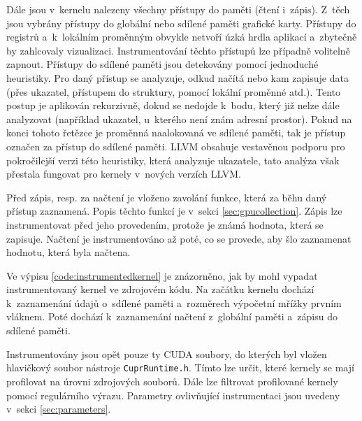 Dále jsou v~kernelu nalezeny všechny přístupy do paměti (čtení i~zápis). Z~těch jsou vybrány přístupy do globální nebo sdílené paměti grafické karty. Přístupy do registrů a~k~lokálním proměnným obvykle netvoří úzká hrdla aplikací a~zbytečně by zahlcovaly vizualizaci. Instrumentování těchto přístupů lze případně volitelně zapnout. Přístupy do sdílené paměti jsou detekovány pomocí jednoduché heuristiky. Pro daný přístup se analyzuje, odkud načítá nebo kam zapisuje data (přes ukazatel, přístupem do struktury, pomocí lokální proměnné atd.). Tento postup je aplikován rekurzivně, dokud se nedojde k~bodu, který již nelze dále analyzovat (například ukazatel, u~kterého není znám adresní prostor). Pokud na konci tohoto řetězce je proměnná naalokovaná ve sdílené paměti, tak je přístup označen za přístup do sdílené paměti. LLVM obsahuje vestavěnou podporu pro pokročilejší verzi této heuristiky, která analyzuje ukazatele, tato analýza však přestala fungovat pro kernely v~nových verzích LLVM.

Před zápis, resp. za načtení je vloženo zavolání funkce, která za běhu daný přístup zaznamená. Popis těchto funkcí je v~sekci \ref{sec:gpucollection}. Zápis lze instrumentovat před jeho provedením, protože je známá hodnota, která se zapisuje. Načtení je instrumentováno až poté, co se provede, aby šlo zaznamenat hodnotu, která byla načtena.

Ve výpisu \ref{code:instrumentedkernel} je znázorněno, jak by mohl vypadat instrumentovaný kernel ve zdrojovém kódu. Na začátku kernelu dochází k~zaznamenání údajů o~sdílené paměti a~rozměrech výpočetní mřížky prvním vláknem. Poté dochází k~zaznamenání načtení z~globální paměti a~zápisu do sdílené paměti.
    
Instrumentovány jsou opět pouze ty CUDA soubory, do kterých byl vložen hlavičkový soubor nástroje \texttt{CuprRuntime.h}. Tímto lze určit, které kernely se mají profilovat na úrovni zdrojových souborů. Dále lze filtrovat profilované kernely pomocí regulárního výrazu. Parametry ovlivňující instrumentaci jsou uvedeny v~sekci \ref{sec:parameters}.

